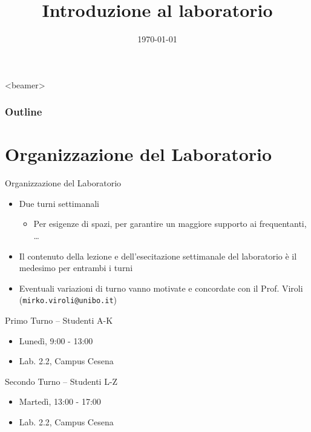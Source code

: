 \documentclass[presentation]{beamer}
\title[{\lab} -- Introduzione]{Introduzione al laboratorio}
\date[\today]{\today}
\begin{document}
\frame[label=coverpage]{\titlepage}

\begin{frame}<beamer>
	\frametitle{Outline}
	\tableofcontents[]
\end{frame}

\section{Organizzazione del Laboratorio}

\begin{frame}{Organizzazione del Laboratorio}

\begin{itemize}
\item Due turni settimanali
\begin{itemize}
\item Per esigenze di spazi, per garantire un maggiore supporto ai frequentanti, \dots
\end{itemize}
\item Il contenuto della lezione e dell'esecitazione settimanale del laboratorio è il medesimo per entrambi i turni
\item Eventuali variazioni di turno vanno motivate e concordate con il Prof. Viroli (\texttt{mirko.viroli@unibo.it})
\end{itemize}

\begin{block}{Primo Turno -- Studenti A-K}
\begin{itemize}
\item Lunedì, 9:00 - 13:00
\item Lab. 2.2, Campus Cesena
\end{itemize}
\end{block}

\begin{block}{Secondo Turno -- Studenti L-Z}
\begin{itemize}
\item Martedì, 13:00 - 17:00
\item Lab. 2.2, Campus Cesena
\end{itemize}
\end{block}

\end{frame}
\end{document}
